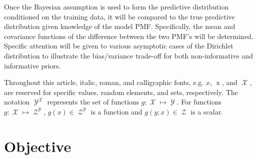 \documentclass[conference]{IEEEtran}
\DeclareMathOperator{\xrm}{\mathrm{x}}
\DeclareMathOperator{\yrm}{\mathrm{y}}
\DeclareMathOperator{\Drm}{\mathrm{D}}
\DeclareMathOperator{\Prm}{\mathrm{P}}
\DeclareMathOperator{\Xcal}{\mathcal{X}}
\DeclareMathOperator{\Ycal}{\mathcal{Y}}
\DeclareMathOperator{\Dcal}{\mathcal{D}}
\DeclareMathOperator{\Zcal}{\mathcal{Z}}
\DeclareMathOperator{\Rbb}{\mathbb{R}}
\begin{document}
Once the Bayesian assumption is used to form the predictive distribution conditioned on the training data, it will be compared to the true predictive distribution given knowledge of the model PMF. Specifically, the mean and covariance functions of the difference between the two PMF's will be determined. Specific attention will be given to various asymptotic cases of the Dirichlet distribution to illustrate the bias/variance trade-off for both non-informative and informative priors.



Throughout this article, italic, roman, and calligraphic fonts, e.g. $x$, $\xrm$, and $\Xcal$, are reserved for specific values, random elements, and sets, respectively. The notation $\Ycal^{\Xcal}$ represents the set of functions $g: \Xcal \mapsto \Ycal$. For functions $g: \Xcal \mapsto \Zcal^{\Ycal}$, $g(x) \in \Zcal^{\Ycal}$ is a function and $g(y;x) \in \Zcal$ is a scalar.





\section{Objective} \label{sec:objective}

\end{document}
